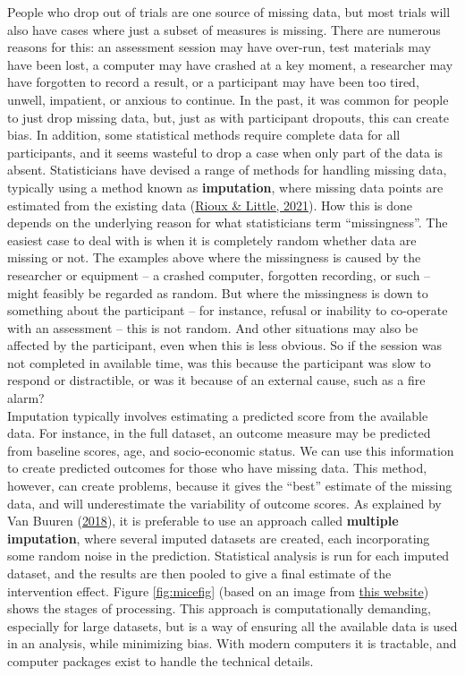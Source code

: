 \documentclass{krantz}
\begin{document}
People who drop out of trials are one source of missing data, but most trials will also have cases where just a subset of measures is missing. There are numerous reasons for this: an assessment session may have over-run, test materials may have been lost, a computer may have crashed at a key moment, a researcher may have forgotten to record a result, or a participant may have been too tired, unwell, impatient, or anxious to continue. In the past, it was common for people to just drop missing data, but, just as with participant dropouts, this can create bias. In addition, some statistical methods require complete data for all participants, and it seems wasteful to drop a case when only part of the data is absent. Statisticians have devised a range of methods for handling missing data, typically using a method known as \textbf{imputation}, where missing data points are estimated from the existing data (\protect\hyperlink{ref-rioux2021}{Rioux \& Little, 2021}). How this is done depends on the underlying reason for what statisticians term ``missingness''. The easiest case to deal with is when it is completely random whether data are missing or not. The examples above where the missingness is caused by the researcher or equipment -- a crashed computer, forgotten recording, or such -- might feasibly be regarded as random. But where the missingness is down to something about the participant -- for instance, refusal or inability to co-operate with an assessment -- this is not random. And other situations may also be affected by the participant, even when this is less obvious. So if the session was not completed in available time, was this because the participant was slow to respond or distractible, or was it because of an external cause, such as a fire alarm?\\
Imputation typically involves estimating a predicted score from the available data. For instance, in the full dataset, an outcome measure may be predicted from baseline scores, age, and socio-economic status. We can use this information to create predicted outcomes for those who have missing data. This method, however, can create problems, because it gives the ``best'' estimate of the missing data, and will underestimate the variability of outcome scores. As explained by Van Buuren (\protect\hyperlink{ref-vanbuuren2018}{2018}), it is preferable to use an approach called \textbf{multiple imputation}, where several imputed datasets are created, each incorporating some random noise in the prediction. Statistical analysis is run for each imputed dataset, and the results are then pooled to give a final estimate of the intervention effect. Figure \ref{fig:micefig} (based on an image from \href{https://data.library.virginia.edu/getting-started-with-multiple-imputation-in-r/}{this website}) shows the stages of processing. This approach is computationally demanding, especially for large datasets, but is a way of ensuring all the available data is used in an analysis, while minimizing bias. With modern computers it is tractable, and computer packages exist to handle the technical details.
\end{document}
